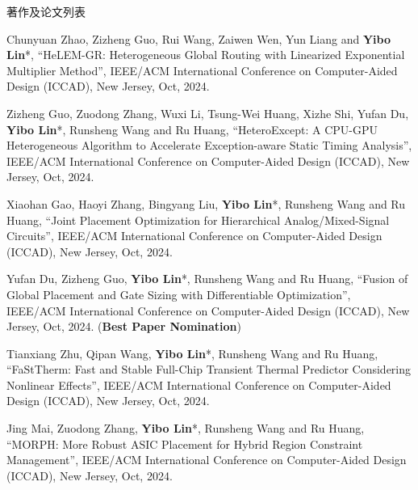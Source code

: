 \begin{rSection}{著作及论文列表}
\begin{description}[font=\normalfont, rightmargin=2em]
{}
            

\item[{[C163]}]{
        Chunyuan Zhao, Zizheng Guo, Rui Wang, Zaiwen Wen, Yun Liang and \textbf{Yibo Lin}*, 
    ``HeLEM-GR: Heterogeneous Global Routing with Linearized Exponential Multiplier Method'', 
    IEEE/ACM International Conference on Computer-Aided Design (ICCAD), New Jersey, Oct, 2024.
    
}
            

\item[{[C162]}]{
        Zizheng Guo, Zuodong Zhang, Wuxi Li, Tsung-Wei Huang, Xizhe Shi, Yufan Du, \textbf{Yibo Lin}*, Runsheng Wang and Ru Huang, 
    ``HeteroExcept: A CPU-GPU Heterogeneous Algorithm to Accelerate Exception-aware Static Timing Analysis'', 
    IEEE/ACM International Conference on Computer-Aided Design (ICCAD), New Jersey, Oct, 2024.
    
}
            

\item[{[C161]}]{
        Xiaohan Gao, Haoyi Zhang, Bingyang Liu, \textbf{Yibo Lin}*, Runsheng Wang and Ru Huang, 
    ``Joint Placement Optimization for Hierarchical Analog/Mixed-Signal Circuits'', 
    IEEE/ACM International Conference on Computer-Aided Design (ICCAD), New Jersey, Oct, 2024.
    
}
            

\item[{[C160]}]{
        Yufan Du, Zizheng Guo, \textbf{Yibo Lin}*, Runsheng Wang and Ru Huang, 
    ``Fusion of Global Placement and Gate Sizing with Differentiable Optimization'', 
    IEEE/ACM International Conference on Computer-Aided Design (ICCAD), New Jersey, Oct, 2024.
    (\textbf{Best Paper Nomination})
}
            

\item[{[C159]}]{
        Tianxiang Zhu, Qipan Wang, \textbf{Yibo Lin}*, Runsheng Wang and Ru Huang, 
    ``FaStTherm: Fast and Stable Full-Chip Transient Thermal Predictor Considering Nonlinear Effects'', 
    IEEE/ACM International Conference on Computer-Aided Design (ICCAD), New Jersey, Oct, 2024.
    
}
            

\item[{[C158]}]{
        Jing Mai, Zuodong Zhang, \textbf{Yibo Lin}*, Runsheng Wang and Ru Huang, 
    ``MORPH: More Robust ASIC Placement for Hybrid Region Constraint Management'', 
    IEEE/ACM International Conference on Computer-Aided Design (ICCAD), New Jersey, Oct, 2024.
    
}
\end{description}
\end{rSection}
